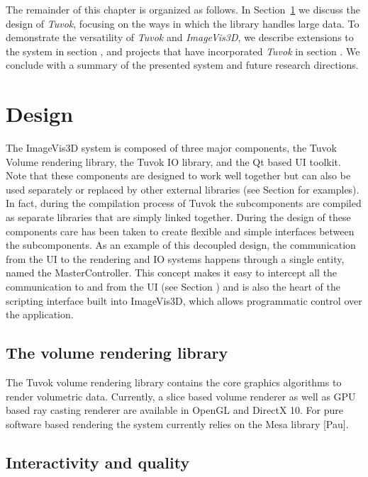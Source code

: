 The remainder of this chapter is organized as follows. In
Section~\ref{sec:design} we discuss the design of \textit{Tuvok},
focusing on the ways in which the library handles large data. To
demonstrate
the versatility of \textit{Tuvok} and \textit{ImageVis3D}, we describe
extensions
to the system in section , and projects that have
incorporated \textit{Tuvok} in section . We conclude with a
summary of the presented system and future research directions.

\section{Design}
\label{sec:design}

The ImageVis3D system is composed of three major
components, the Tuvok Volume rendering library, the Tuvok IO
library, and the Qt based UI toolkit. Note that these
components are designed to work well together but can also be
used separately or replaced by other external libraries (see
Section  for examples). In fact, during the compilation
process of Tuvok the subcomponents are compiled as separate
libraries that are simply linked together. During the design of
these components care has been taken to create flexible and
simple interfaces between the subcomponents. As an example
of this decoupled design, the communication from the
UI to the rendering and IO systems happens through a single
entity, named the MasterController. This concept makes
it easy to intercept all the communication to and from the
UI (see Section ) and is also the heart of the scripting
interface built into ImageVis3D, which allows programmatic
control over the application.

\subsection{The volume rendering library}

The Tuvok volume rendering library contains the core graphics
algorithms to render volumetric data. Currently, a slice
based volume renderer as well as GPU based ray casting
renderer are available in OpenGL and DirectX 10. For pure
software based rendering the system currently relies on the
Mesa library [Pau].

\subsection{Interactivity and quality}

